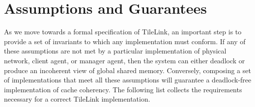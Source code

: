 \section{Assumptions and Guarantees}

As we move towards a formal specification of TileLink, an important step is to provide a set of invariants to which any implementation must conform.
If any of these assumptions are not met by a particular implementation of physical network, client agent,
or manager agent, then the system can either deadlock or produce an incoherent view of global shared memory.
Conversely, composing a set of implementations that meet all these assumptions will
guarantee a deadlock-free implementation of cache coherency.
The following list collects the requirements necessary for a correct TileLink implementation.

